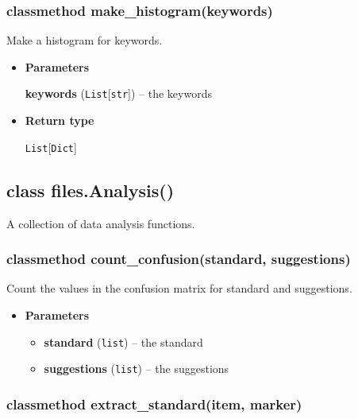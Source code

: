 \hypertarget{classmethod-make_histogramkeywords}{%
\subsubsection{classmethod
make\_histogram(keywords)}\label{classmethod-make_histogramkeywords}}

Make a histogram for keywords.

\begin{itemize}
\item
  \textbf{Parameters}

  \textbf{keywords} (\texttt{List}{[}\texttt{str}{]}) -- the keywords
\item
  \textbf{Return type}

  \texttt{List}{[}\texttt{Dict}{]}
\end{itemize}

\hypertarget{class-files.analysis}{%
\subsection{class files.Analysis()}\label{class-files.analysis}}

A collection of data analysis functions.

\hypertarget{classmethod-count_confusionstandard-suggestions}{%
\subsubsection{classmethod count\_confusion(standard,
suggestions)}\label{classmethod-count_confusionstandard-suggestions}}

Count the values in the confusion matrix for standard and suggestions.

\begin{itemize}
\item
  \textbf{Parameters}

  \begin{itemize}
  \item
    \textbf{standard} (\texttt{list}) -- the standard
  \item
    \textbf{suggestions} (\texttt{list}) -- the suggestions
  \end{itemize}
\end{itemize}

\hypertarget{classmethod-extract_standarditem-marker}{%
\subsubsection{classmethod extract\_standard(item,
marker)}\label{classmethod-extract_standarditem-marker}}

